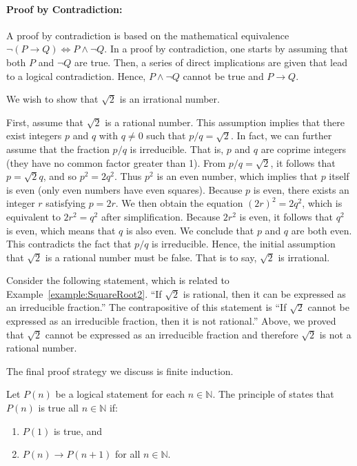 \paragraph{Proof by Contradiction:}
A proof by contradiction is based on the mathematical equivalence $\neg (P \rightarrow Q) \Leftrightarrow P \wedge \neg Q$.
In a proof by contradiction, one starts by assuming that both $P$ and $\neg Q$ are true.
Then, a series of direct implications are given that lead to a logical contradiction.
Hence, $P \wedge \neg Q$ cannot be true and $P \rightarrow Q$.

\begin{example} \label{example:SquareRoot2}
We wish to show that $\sqrt{2}$ is an irrational number.

First, assume that $\sqrt{2}$ is a rational number.
This assumption implies that there exist integers $p$ and $q$ with $q \neq 0$ such that $p/q = \sqrt{2}$.
In fact, we can further assume that the fraction $p/q$ is irreducible.
That is, $p$ and $q$ are coprime integers (they have no common factor greater than 1).
From $p/q = \sqrt{2}$, it follows that $p = \sqrt{2} q$, and so $p^2 = 2 q^2$.
Thus $p^2$ is an even number, which implies that $p$ itself is even (only even numbers have even squares).
Because $p$ is even, there exists an integer $r$ satisfying $p = 2r$.
We then obtain the equation $(2r)^2 = 2q^2$, which is equivalent to $2r^2 = q^2$ after simplification.
Because $2r^2$ is even, it follows that $q^2$ is even, which means that $q$ is also even.
We conclude that $p$ and $q$ are both even.
This contradicts the fact that $p/q$ is irreducible.
Hence, the initial assumption that $\sqrt{2}$ is a rational number must be false.
That is to say, $\sqrt{2}$ is irrational.
\end{example}

\begin{example}
Consider the following statement, which is related to Example~\ref{example:SquareRoot2}.
``If $\sqrt{2}$ is rational, then it can be expressed as an irreducible fraction.''
The contrapositive of this statement is ``If $\sqrt{2}$ cannot be expressed as an irreducible fraction, then it is not rational.''
Above, we proved that $\sqrt{2}$ cannot be expressed as an irreducible fraction and therefore $\sqrt{2}$ is not a rational number.
\end{example}

The final proof strategy we discuss is finite induction.

\begin{definition}
Let $P(n)$ be a logical statement for each $n\in \mathbb{N}$.
The principle of  states that $P(n)$ is true all $n\in \mathbb{N}$ if:
\begin{enumerate}
\item $P(1)$ is true, and
\item $P(n)\to P(n+1)$ for all $n\in \mathbb{N}$.
\end{enumerate}
\end{definition}

